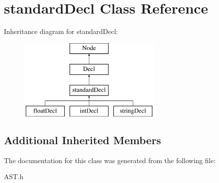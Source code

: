 \hypertarget{classstandardDecl}{\section{standard\-Decl Class Reference}
\label{classstandardDecl}
}
Inheritance diagram for standard\-Decl\-:\begin{figure}[H]
\begin{center}
\leavevmode
\includegraphics[height=4.000000cm]{classstandardDecl}
\end{center}
\end{figure}
\subsection*{Additional Inherited Members}


The documentation for this class was generated from the following file\-:\begin{DoxyCompactItemize}
\item 
A\-S\-T.\-h\end{DoxyCompactItemize}
